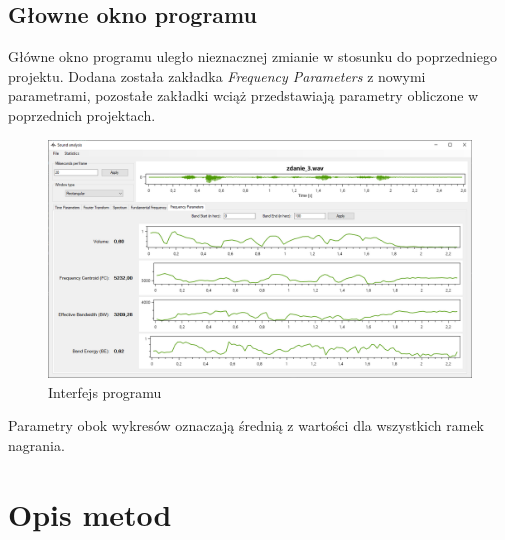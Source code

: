 \documentclass[a4paper]{article}
\begin{document}
\subsection{Głowne okno programu}
Główne okno programu uległo nieznacznej zmianie w stosunku do poprzedniego projektu. Dodana została zakładka \textit{Frequency Parameters} z nowymi parametrami, pozostałe zakładki wciąż przedstawiają parametry obliczone w poprzednich projektach.
\begin{figure}[H]
  \centering
  \includegraphics[width=0.75\linewidth]{images/01interface.png}
  \caption{Interfejs programu}
\end{figure}
\noindent Parametry obok wykresów oznaczają średnią z wartości dla wszystkich ramek nagrania.

\section{Opis metod}
\end{document}

